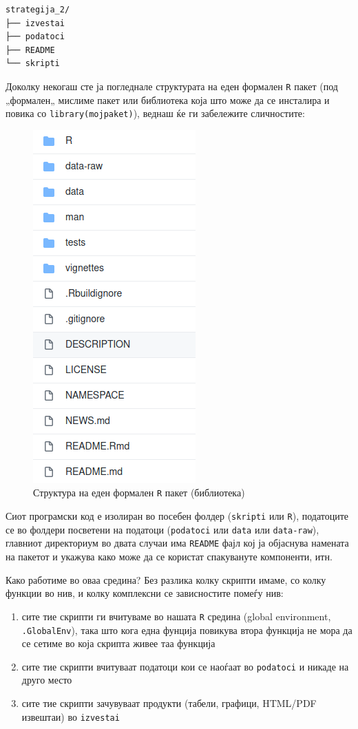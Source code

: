 \documentclass[
]{book}
\providecommand{\tightlist}{%
  \setlength{\itemsep}{0pt}\setlength{\parskip}{0pt}}
\begin{document}
\begin{verbatim}
strategija_2/
├── izvestai
├── podatoci
├── README
└── skripti
\end{verbatim}

Доколку некогаш сте ја погледнале структурата на еден формален \texttt{R} пакет (под „формален„ мислиме пакет или библиотека која што може да се инсталира и повика со \texttt{library(mojpaket)}), веднаш ќе ги забележите сличностите:

\begin{figure}
\centering
\includegraphics{www/package-structure.png}
\caption{Структура на еден формален \texttt{R} пакет (библиотека)}
\end{figure}

Сиот програмски код е изолиран во посебен фолдер (\texttt{skripti} или \texttt{R}), податоците се во фолдери посветени на податоци (\texttt{podatoci} или \texttt{data} или \texttt{data-raw}), главниот директориум во двата случаи има \texttt{README} фајл кој ја објаснува намената на пакетот и укажува како може да се користат спакувануте компоненти, итн.

Како работиме во оваа средина? Без разлика колку скрипти имаме, со колку функции во нив, и колку комплексни се зависностите помеѓу нив:

\begin{enumerate}
\def\labelenumi{\arabic{enumi}.}
\tightlist
\item
  сите тие скрипти ги вчитуваме во нашата \texttt{R} средина (global environment, \texttt{.GlobalEnv}), така што кога една фунција повикува втора функција не мора да се сетиме во која скрипта живее таа функција\\
\item
  сите тие скрипти вчитуваат податоци кои се наоѓаат во \texttt{podatoci} и никаде на друго место\\
\item
  сите тие скрипти зачувуваат продукти (табели, графици, HTML/PDF извештаи) во \texttt{izvestai}
\end{enumerate}
\end{document}
